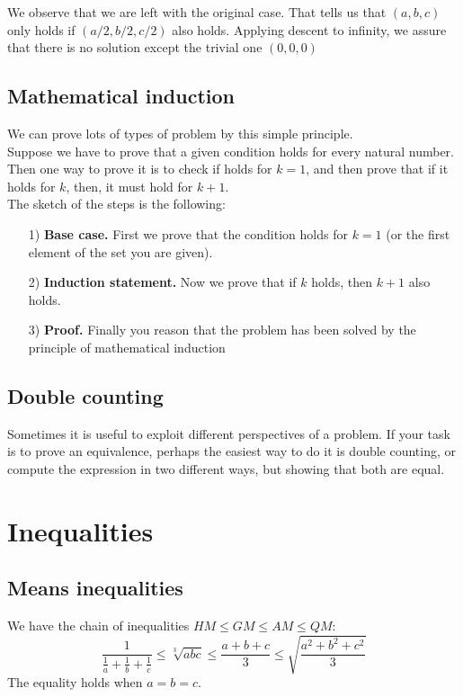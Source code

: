 \documentclass[12pt]{article}
\begin{document}
    We observe that we are left with the original case. That tells us that $(a, b, c)$ only holds if $(a/2, b/2, c/2)$ also holds. Applying descent to infinity, we assure that there is no solution except the trivial one $(0,0,0)$
    
    \subsection{Mathematical induction}
    We can prove lots of types of problem by this simple principle. \\
    
    Suppose we have to prove that a given condition holds for every natural number. Then one way to prove it is to check if holds for $k=1$, and then prove that if it holds for $k$, then, it must hold for $k+1$. \\
    
    The sketch of the steps is the following:
    \begin{itemize}
        \item[1)] \textbf{Base case.} First we prove that the condition holds for $k=1$ (or the first element of the set you are given).
        \item[2)] \textbf{Induction statement.} Now we prove that if $k$ holds, then $k+1$ also holds.
        \item[3)] \textbf{Proof.} Finally you reason that the problem has been solved by the principle of mathematical induction 
    \end{itemize}
    
    \subsection{Double counting}
    Sometimes it is useful to exploit different perspectives of a problem. If your task is to prove an equivalence, perhaps the easiest way to do it is double counting, or compute the expression in two different ways, but showing that both are equal.
    
\section{Inequalities}
    \subsection{Means inequalities}
    We have the chain of inequalities $HM\leq GM\leq AM\leq QM$:
    \[\frac{1}{\frac{1}{a}+\frac{1}{b}+\frac{1}{c}}\leq \sqrt[3]{abc}\leq \frac{a+b+c}{3}\leq \sqrt{\frac{a^2+b^2+c^2}{3}} \]
    The equality holds when $a=b=c$.
    
\end{document}
